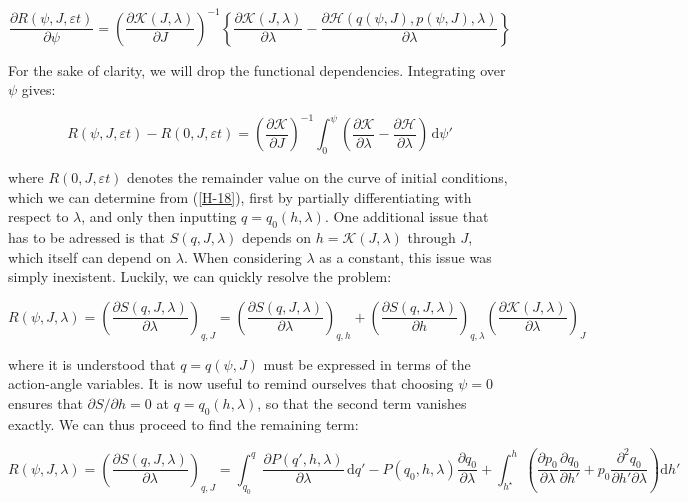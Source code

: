 \begin{equation*}
    \frac{\partial R(\psi, J,\varepsilon t)}{\partial \psi}=\left(\frac{\partial\mathcal{K}(J,\lambda)}{\partial J}\right)^{-1}\left\{\frac{\partial \mathcal{K}(J,\lambda)}{\partial \lambda}-\frac{\partial \mathcal{H}(q(\psi,J),p(\psi, J),\lambda)}{\partial \lambda}\right\}
\end{equation*}

For the sake of clarity, we will drop the functional dependencies. Integrating over $\psi$ gives:

\begin{equation}
    \label{H-19}
    R(\psi, J,\varepsilon t)-R(0,J,\varepsilon t)=\left(\frac{\partial\mathcal{K}}{\partial J}\right)^{-1}\int_0^\psi \left(\frac{\partial \mathcal{K}}{\partial \lambda}-\frac{\partial \mathcal{H}}{\partial \lambda}\right)\,\mathrm{d}\psi'
\end{equation}

where $R(0,J,\varepsilon t)$ denotes the remainder value on the curve of initial conditions, which we can determine from (\ref{H-18}), first by partially differentiating with respect to $\lambda$, and only then inputting $q=q_0(h,\lambda)$. One additional issue that has to be adressed is that $S(q,J,\lambda)$ depends on $h=\mathcal{K}(J,\lambda)$ through $J$, which itself can depend on $\lambda$. When considering $\lambda$ as a constant, this issue was simply inexistent. Luckily, we can quickly resolve the problem:

\begin{equation*}
    R(\psi,J,\lambda)=\left(\frac{\partial S(q,J,\lambda)}{\partial \lambda}\right)_{q,J}=\left(\frac{\partial S(q,J,\lambda)}{\partial \lambda}\right)_{q,h}+\left(\frac{\partial S(q,J,\lambda)}{\partial h}\right)_{q,\lambda}\left(\frac{\partial\mathcal{K}(J,\lambda)}{\partial \lambda}\right)_J
\end{equation*}

where it is understood that $q=q(\psi, J)$ must be expressed in terms of the action-angle variables. It is now useful to remind ourselves that choosing $\psi=0$ ensures that $\partial S/\partial h=0$ at $q=q_0(h,\lambda)$, so that the second term vanishes exactly. We can thus proceed to find the remaining term:

\begin{equation}
    \label{H-20}
    R(\psi,J,\lambda)=\left(\frac{\partial S(q,J,\lambda)}{\partial \lambda}\right)_{q,J}=\int_{q_0}^q \frac{\partial P(q',h,\lambda)}{\partial \lambda}\,\mathrm{d}q'-P(q_0,h,\lambda)\frac{\partial q_0}{\partial \lambda}+\int_{h^\star}^h\left(\frac{\partial p_0}{\partial \lambda}\frac{\partial q_0}{\partial h'}+p_0 \frac{\partial^2 q_0}{\partial h'\partial\lambda}\right)\mathrm{d}h'
\end{equation}

